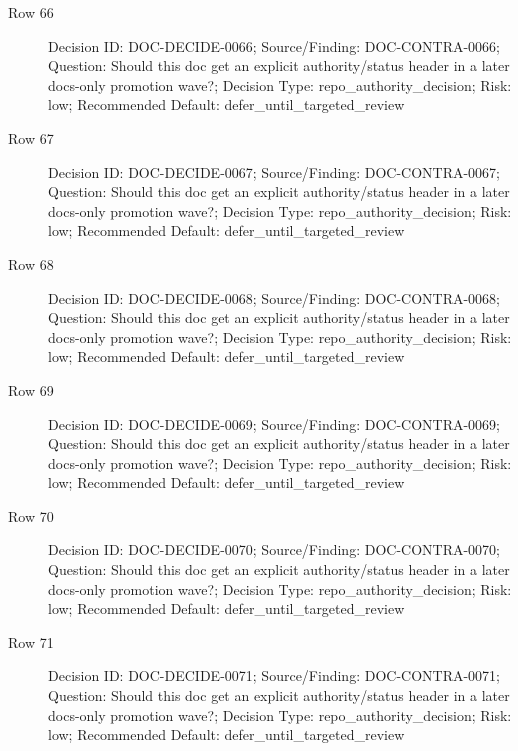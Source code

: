 \documentclass[9pt,a4paper,openany]{book}
\begin{document}
\begin{description}
\item[Row 66] Decision ID: DOC-\allowbreak{}DECIDE-\allowbreak{}0066; Source/\allowbreak{}Finding: DOC-\allowbreak{}CONTRA-\allowbreak{}0066; Question: Should this doc get an explicit authority/\allowbreak{}status header in a later docs-\allowbreak{}only promotion wave?; Decision Type: repo\_\allowbreak{}authority\_\allowbreak{}decision; Risk: low; Recommended Default: defer\_\allowbreak{}until\_\allowbreak{}targeted\_\allowbreak{}review
\item[Row 67] Decision ID: DOC-\allowbreak{}DECIDE-\allowbreak{}0067; Source/\allowbreak{}Finding: DOC-\allowbreak{}CONTRA-\allowbreak{}0067; Question: Should this doc get an explicit authority/\allowbreak{}status header in a later docs-\allowbreak{}only promotion wave?; Decision Type: repo\_\allowbreak{}authority\_\allowbreak{}decision; Risk: low; Recommended Default: defer\_\allowbreak{}until\_\allowbreak{}targeted\_\allowbreak{}review
\item[Row 68] Decision ID: DOC-\allowbreak{}DECIDE-\allowbreak{}0068; Source/\allowbreak{}Finding: DOC-\allowbreak{}CONTRA-\allowbreak{}0068; Question: Should this doc get an explicit authority/\allowbreak{}status header in a later docs-\allowbreak{}only promotion wave?; Decision Type: repo\_\allowbreak{}authority\_\allowbreak{}decision; Risk: low; Recommended Default: defer\_\allowbreak{}until\_\allowbreak{}targeted\_\allowbreak{}review
\item[Row 69] Decision ID: DOC-\allowbreak{}DECIDE-\allowbreak{}0069; Source/\allowbreak{}Finding: DOC-\allowbreak{}CONTRA-\allowbreak{}0069; Question: Should this doc get an explicit authority/\allowbreak{}status header in a later docs-\allowbreak{}only promotion wave?; Decision Type: repo\_\allowbreak{}authority\_\allowbreak{}decision; Risk: low; Recommended Default: defer\_\allowbreak{}until\_\allowbreak{}targeted\_\allowbreak{}review
\item[Row 70] Decision ID: DOC-\allowbreak{}DECIDE-\allowbreak{}0070; Source/\allowbreak{}Finding: DOC-\allowbreak{}CONTRA-\allowbreak{}0070; Question: Should this doc get an explicit authority/\allowbreak{}status header in a later docs-\allowbreak{}only promotion wave?; Decision Type: repo\_\allowbreak{}authority\_\allowbreak{}decision; Risk: low; Recommended Default: defer\_\allowbreak{}until\_\allowbreak{}targeted\_\allowbreak{}review
\item[Row 71] Decision ID: DOC-\allowbreak{}DECIDE-\allowbreak{}0071; Source/\allowbreak{}Finding: DOC-\allowbreak{}CONTRA-\allowbreak{}0071; Question: Should this doc get an explicit authority/\allowbreak{}status header in a later docs-\allowbreak{}only promotion wave?; Decision Type: repo\_\allowbreak{}authority\_\allowbreak{}decision; Risk: low; Recommended Default: defer\_\allowbreak{}until\_\allowbreak{}targeted\_\allowbreak{}review

\end{description}
\end{document}
